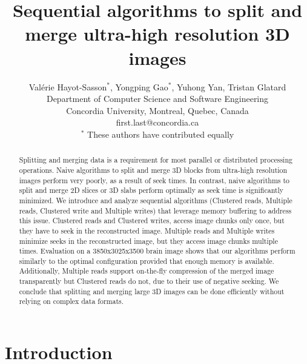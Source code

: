 \documentclass[10pt, conference, compsocconf]{IEEEtran}
\begin{document}
\title{Sequential algorithms to split and merge ultra-high resolution 3D images}

\author{Val\'erie Hayot-Sasson$^*$, Yongping Gao$^*$, Yuhong Yan, Tristan Glatard\\
  Department of Computer Science and Software Engineering\\ Concordia University, Montreal, Quebec, Canada\\
  {first.last}@concordia.ca\\
  $^*$ These authors have contributed equally
  
}

\maketitle

\begin{abstract}
  Splitting and merging data is a requirement for most parallel or
  distributed processing operations. Naive algorithms to split and
  merge 3D blocks from ultra-high resolution images perform very poorly,
  as a result of seek times. In contrast, naive algorithms to split and 
  merge 2D slices or 3D slabs perform optimally as seek time is significantly minimized.
  We introduce and analyze sequential algorithms (Clustered reads, Multiple reads, Clustered write and Multiple writes)
  that leverage memory buffering to
  address this issue. Clustered reads and Clustered writes, access
  image chunks only once, but they have to seek in the reconstructed
  image. Multiple reads and Multiple writes minimize seeks in the
  reconstructed image, but they access image chunks multiple
  times. Evaluation on a 3850x3025x3500 brain image shows that our
  algorithms perform similarly to the optimal configuration provided that enough memory is available. 
  Additionally, Multiple reads support on-the-fly compression of the 
  merged image transparently but Clustered reads do not, due to their use of negative seeking. We
  conclude that splitting and merging large 3D images can be done
  efficiently without relying on complex data formats.
\end{abstract}


\section{Introduction}
\end{document}
